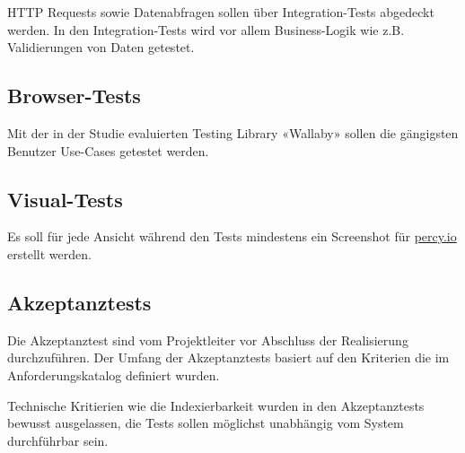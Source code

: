 HTTP Requests sowie Datenabfragen sollen über Integration-Tests abgedeckt
werden. In den Integration-Tests wird vor allem Business-Logik wie z.B.
Validierungen von Daten getestet.

\subsection{Browser-Tests}\label{browsertests}

Mit der in der Studie evaluierten Testing Library «Wallaby» sollen die
gängigsten Benutzer Use-Cases getestet werden.

\subsection{Visual-Tests}\label{visualtests}

Es soll für jede Ansicht während den Tests mindestens ein Screenshot für
\href{https://percy.io/}{percy.io} erstellt werden.

\clearpage
\subsection{Akzeptanztests}\label{akzeptanztests}

Die Akzeptanztest sind vom Projektleiter vor Abschluss der Realisierung
durchzuführen. Der Umfang der Akzeptanztests basiert auf den Kriterien die im
Anforderungskatalog definiert wurden.

Technische Kritierien wie die Indexierbarkeit wurden in den Akzeptanztests
bewusst ausgelassen, die Tests sollen möglichst unabhängig vom System
durchführbar sein.



